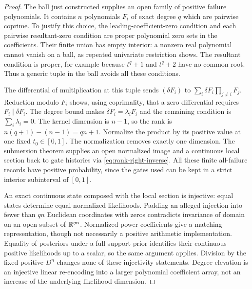 \begin{proof}
The ball just constructed supplies an open family of positive failure
polynomials. It contains $n$ polynomials $F_i$ of exact degree $q$ which
are pairwise coprime. To justify this choice, the leading-coefficient-zero
condition and each pairwise resultant-zero condition are proper polynomial
zero sets in the coefficients. Their finite union has empty interior:
a nonzero real polynomial cannot vanish on a ball, as repeated univariate
restriction shows. The resultant condition is proper, for example because
$t^q+1$ and $t^q+2$ have no common root. Thus a generic tuple in the ball
avoids all these conditions.

The differential of multiplication at this tuple sends $(\delta F_i)$ to
$\sum_i\delta F_i\prod_{j\ne i}F_j$. Reduction modulo $F_i$ shows, using
coprimality, that a zero differential requires $F_i\mid\delta F_i$.
The degree bound makes $\delta F_i=\lambda_i F_i$ and the remaining
condition is $\sum_i\lambda_i=0$. The kernel dimension is $n-1$, so the
rank is $n(q+1)-(n-1)=qn+1$. Normalize the product by its positive value
at one fixed $t_0\in[0,1]$. The normalization removes exactly one dimension.
The submersion theorem supplies an open normalized image and a continuous
local section back to gate histories via \eqref{eq:rank-right-inverse}.
All these finite all-failure records have positive probability, since the
gates used can be kept in a strict interior subinterval of $[0,1]$.

An exact continuous state composed with the local section is injective:
equal states determine equal normalized likelihoods. Padding an alleged
injection into fewer than $qn$ Euclidean coordinates with zeros contradicts
invariance of domain on an open subset of $\mathbb R^{qn}$. Normalized power
coefficients give a matching representation, though not necessarily a
positive arithmetic implementation. Equality of posteriors under a
full-support prior identifies their continuous positive likelihoods up to
a scalar, so the same argument applies. Division by the fixed positive
$D^n$ changes none of these injectivity statements. Degree elevation is an
injective linear re-encoding into a larger polynomial coefficient array,
not an increase of the underlying likelihood dimension.
\end{proof}

